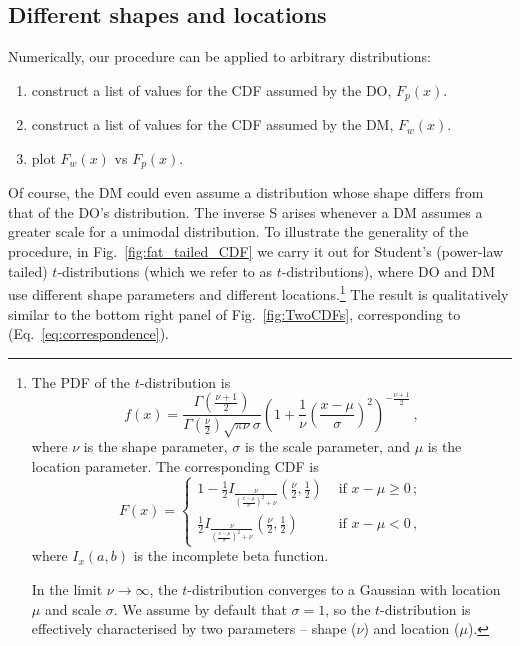 \documentclass[a4paper, 12pt]{article}
\newcommand{\eref}[1]{(Eq.~\ref{eq:#1})}
\newcommand{\fref}[1]{Fig.~\ref{fig:#1}}
\newcommand{\seclabel}[1]{\label{sec:#1}}
\newcommand{\be}{\begin{equation}}
\newcommand{\ee}{\end{equation}}
\begin{document}
\subsection{Different shapes and locations\seclabel{Different_shapes}}
Numerically, our procedure can be applied to arbitrary distributions: 
\begin{enumerate}
\item
construct a list of values for the CDF assumed by the DO, $F_p(x)$.
\item
construct a list of values for the CDF assumed by the DM, $F_w(x)$.
\item
plot $F_w(x)$ vs $F_p(x)$.
\end{enumerate}
Of course, the DM could even assume a distribution whose shape differs from that of the DO's distribution. 
The inverse S arises whenever a DM assumes a greater scale for a unimodal distribution. 
To illustrate the generality of the procedure, in \fref{fat_tailed_CDF} we carry it out for Student's (power-law tailed) $t$-distributions (which we refer to as $t$-distributions), where DO and DM use different shape parameters and different locations.\footnote{The PDF of the $t$-distribution is
%
\be
f\left(x\right) = \frac{\Gamma\left(\frac{\nu+1}{2}\right)} {\Gamma\left(\frac{\nu}{2}\right)\sqrt{\pi\nu}\sigma} \left(1+\frac{1}{\nu}\left(\frac{x-\mu}{\sigma}\right)^2 \right)^{-\frac{\nu+1}{2}}\,,
\ee
%
where $\nu$ is the shape parameter, $\sigma$ is the scale parameter, and $\mu$ is the location parameter. The corresponding CDF is
%
\be
F\left(x\right) = 
\begin{cases}
1 - \frac{1}{2} I_{\frac{\nu}{\left(\frac{x-\mu}{\sigma}\right)^2 + \nu}}\left(\frac{\nu}{2},\frac{1}{2}\right) &\text{ if } x-\mu \geq 0\,;\\
\frac{1}{2} I_{\frac{\nu}{\left(\frac{x-\mu}{\sigma}\right)^2 + \nu}}\left(\frac{\nu}{2},\frac{1}{2}\right) &\text{ if } x-\mu < 0\,,
\end{cases}
\ee
%
where $I_x\left(a,b\right)$ is the incomplete beta function.

In the limit $\nu \rightarrow \infty$, the $t$-distribution converges to a Gaussian with location $\mu$ and scale $\sigma$. We assume by default that $\sigma = 1$, so the $t$-distribution is effectively characterised by two parameters -- shape ($\nu$) and location ($\mu$).
}
The result is qualitatively similar to the bottom right panel of \fref{TwoCDFs}, corresponding to \eref{correspondence}. 
\end{document}
